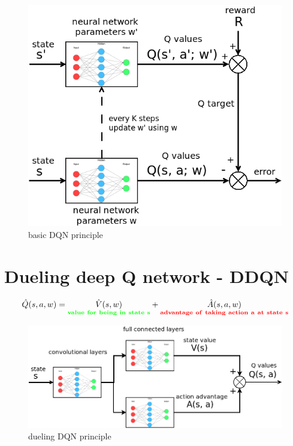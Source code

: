 \documentclass[10pt,a4paper]{article}
\begin{document}
\begin{figure}[!htb]
  \centering
  \includegraphics[scale=0.3]{../../diagrams/dqn.png}
  \caption{basic DQN principle}
  \label{img:dqn}
\end{figure}

\section{Dueling deep Q network - DDQN}

\begin{align}
  \hat{Q}(s, a, w) = \underset{\bf \color{green} value\ for\ being\ in\ state\ s}{\hat{V}(s, w)} + \underset{\bf \color{red} advantage\ of\ taking\ action\ a\ at\ state\ s}{\hat{A}(s, a, w)}
\end{align}


\begin{figure}[!htb]
  \centering
  \includegraphics[scale=0.3]{../../diagrams/dueling_dqn_0.png}
  \caption{dueling DQN principle}
  \label{img:ddqn_principle}
\end{figure} 
\end{document}
